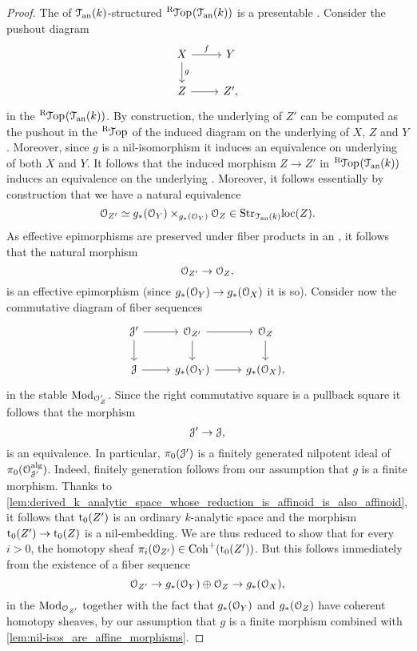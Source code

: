 \documentclass[10pt,a4paper,reqno]{amsart} %
\theoremstyle{plain}
\theoremstyle{definition}
\theoremstyle{remark}
\numberwithin{equation}{section}
\begin{document}
\begin{proof} The \infcat of $\mathcal T_{\mathrm{an}}(k)$-structured \inftopos $\RTop(\cTank)$ is a presentable \infcat. Consider the pushout diagram
        \[
        \begin{tikzcd}
            X \ar{r}{f} \ar{d}{g} & Y \\
            Z \ar{r} & Z',
        \end{tikzcd}
        \]
    in the \infcat $\RTop(\cTank)$. By construction, the underlying \inftopos of $Z'$ can be computed as the pushout in the \infcat $\RTop$ of
    the induced diagram on the underlying \inftopoi of $X$, $Z$ and $Y$. Moreover, since $g$ is a nil-isomorphism it induces an equivalence on underlying \inftopoi
    of both $X$ and $Y$. It follows that the induced morphism $Z \to Z'$ in $\RTop(\cTank)$ induces an equivalence on the underlying \inftopoi.
    Moreover, it follows essentially by construction that we have a natural equivalence
        \[
            \mathcal O_{Z'} \simeq g_*(\mathcal O_Y) \times_{g_*(\mathcal O_Y)} \mathcal O_Z \in \mathrm{Str}_{\mathcal T_{\mathrm{an}}(k)}\mathrm{loc}(Z).
        \]
    As effective epimorphisms are preserved under fiber products in an \inftopos, it follows that the natural morphism
        \[
            \mathcal O_{Z'} \to \mathcal O_Z,  
        \]
    is an effective epimorphism (since $g_*(\mathcal O_Y) \to g_*(\mathcal O_X)$ it is so).
    Consider now the commutative diagram of fiber sequences
        \[
        \begin{tikzcd}
            \cJ ' \ar{r} \ar{d} & \cO_{Z'} \ar{r} \ar{d}  & \cO_Z \ar{d} \\
            \cJ \ar{r} & g_*(\cO_Y) \ar{r} & g_*(\cO_X),
        \end{tikzcd}
        \]
    in the stable \infcat $\mathrm{Mod}_{\mathcal O_Z'}$. Since the right commutative square is a pullback square it follows that the morphism
        \[
            \mathcal J' \to \mathcal J,  
        \]
    is an equivalence. In particular, $\pi_0(\mathcal J')$ is a finitely generated
    nilpotent ideal of $\pi_0(\mathcal O^\mathrm{alg}_{\mathcal J'})$. Indeed, finitely generation follows from our assumption that $g$ is a finite morphism.
    Thanks to \cref{lem:derived_k_analytic_space_whose_reduction_is_affinoid_is_also_affinoid},
    it follows that $\mathrm{t}_0(Z')$ is an ordinary $k$-analytic space and the morphism $\mathrm{t}_0(Z') \to \mathrm{t}_0(Z)$ is a nil-embedding. We are thus reduced to show that
    for every $i>0$, the homotopy sheaf $\pi_i(\mathcal O_{Z'}) \in \mathrm{Coh}^+(\mathrm{t}_0(Z'))$. But this follows immediately from the existence of a fiber sequence
        \[
            \mathcal O_{Z'} \to g_*(\mathcal O_Y) \oplus \mathcal O_Z \to g_*(\mathcal O_X),  
        \]
    in the \infcat $\mathrm{Mod}_{\mathcal O_{Z'}}$ together with the fact that $g_*(\mathcal O_Y)$ and $g_*(\mathcal O_Z)$ have coherent homotopy sheaves, by our assumption that $g$ is a
    finite morphism combined with \cref{lem:nil-isos_are_affine_morphisms}.
\end{proof}
\end{document}
